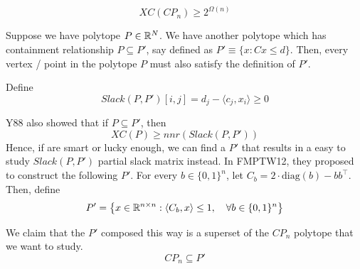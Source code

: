 \begin{theorem}
	\begin{equation}
		XC(CP_n) \geq 2^{\Omega (n)}
	\end{equation}	
\end{theorem}

\begin{definition}
	Suppose we have polytope $P \in \mathbb{R}^N$. We have another polytope which has containment relationship $P \subseteq P'$, say defined as $P' \equiv \{ x: Cx \leq d \}$. Then, every vertex / point in the polytope $P$ must also satisfy the definition of $P'$.  
	
	Define 
	\begin{equation}
		Slack(P,P')[i, j] = d_j - \langle c_j , x_i \rangle \geq 0
	\end{equation}
\end{definition}

Y88 also showed that if $P \subseteq P'$, then
\begin{equation}
	XC(P) \geq nnr(Slack(P, P'))
\end{equation}
Hence, if are smart or lucky enough, we can find a $P'$ that results in a easy to study $Slack(P, P')$ partial slack matrix instead. In FMPTW12, they proposed to construct the following $P'$. For every $b \in \{0, 1\}^n$, let $C_b = 2\cdot \mathrm{diag} (b) - bb^\top $. Then, define
\begin{equation}
	P' = \left\{ x \in \mathbb{R}^{n \times n} : \langle C_b, x \rangle \leq 1, \quad \forall b \in \{0, 1\}^n \right\}
\end{equation}
 
\begin{proposition}
	We claim that the $P'$ composed this way is a superset of the $CP_n$ polytope that we want to study. 
	\begin{equation}
		CP_n \subseteq P'
	\end{equation}
\end{proposition}

